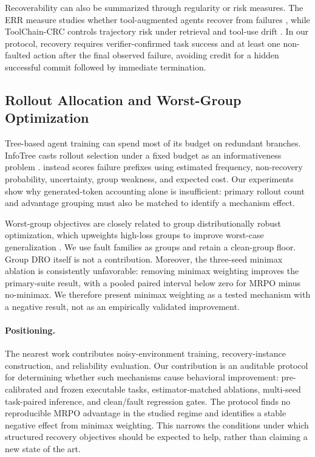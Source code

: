 Recoverability can also be summarized through regularity or risk measures. The
ERR measure studies whether tool-augmented agents recover from failures
\citep{vuddanti2026recoverability}, while ToolChain-CRC controls trajectory risk
under retrieval and tool-use drift \citep{opoku2026toolchaincrc}. In our
protocol, recovery requires verifier-confirmed task success and at least one
non-faulted action after the final observed failure, avoiding credit for a
hidden successful commit followed by immediate termination.

\subsection{Rollout Allocation and Worst-Group Optimization}

Tree-based agent training can spend most of its budget on redundant branches.
InfoTree casts rollout selection under a fixed budget as an informativeness
problem \citep{hu2026infotree}. \method{} instead scores failure prefixes using
estimated frequency, non-recovery probability, uncertainty, group weakness, and
expected cost. Our experiments show why generated-token accounting alone is
insufficient: primary rollout count and advantage grouping must also be matched
to identify a mechanism effect.

Worst-group objectives are closely related to group distributionally robust
optimization, which upweights high-loss groups to improve worst-case
generalization \citep{sagawa2020groupdro}. We use fault families as groups and
retain a clean-group floor. Group DRO itself is not a contribution. Moreover,
the three-seed minimax ablation is consistently unfavorable: removing minimax
weighting improves the primary-suite result, with a pooled paired interval below
zero for MRPO minus no-minimax. We therefore present minimax weighting as a
tested mechanism with a negative result, not as an empirically validated
improvement.

\paragraph{Positioning.}
The nearest work contributes noisy-environment training, recovery-instance
construction, and reliability evaluation. Our contribution is an auditable
protocol for determining whether such mechanisms cause behavioral improvement:
pre-calibrated and frozen executable tasks, estimator-matched ablations,
multi-seed task-paired inference, and clean/fault regression gates. The protocol
finds no reproducible MRPO advantage in the studied regime and identifies a
stable negative effect from minimax weighting. This narrows the conditions under
which structured recovery objectives should be expected to help, rather than
claiming a new state of the art.
